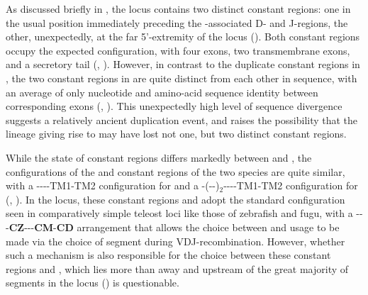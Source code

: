 As discussed briefly in , the \Xma \igh{} locus contains two distinct  constant regions: one in the usual position immediately preceding the -associated D- and J-regions, the other, unexpectedly, at the far 5'-extremity of the locus (). Both  constant regions occupy the expected configuration, with four \cz{} exons, two transmembrane exons, and a secretory tail (, ). However, in contrast to the duplicate constant regions in \Nfu, the two  constant regions in \Xma are quite distinct from each other in sequence, with an average of only  nucleotide and  amino-acid sequence identity between corresponding \cz{} exons (, ). This unexpectedly high level of sequence divergence suggests a relatively ancient duplication event, and raises the possibility that the lineage giving rise to \Nfu may have lost not one, but two distinct  constant regions.
	
\begin{table}
	\centering
	
	\label{tab:xma-cz-aln}
\end{table}

While the state of  constant regions differs markedly between \Xma and \Nfu, the configurations of the  and  constant regions of the two species are quite similar, with a {----TM1-TM2} configuration for  and a {-(--)$_2$----TM1-TM2} configuration for  (, ). In the \Xma locus, these constant regions and  adopt the standard configuration seen in comparatively simple teleost \igh{} loci like those of zebrafish and fugu, with a {\vh-\dh-\jh-\textbf{CZ}-\dh-\jh-\textbf{CM}-\textbf{CD}} arrangement that allows the choice between  and  usage to be made via the choice of \dh segment during VDJ-recombination. However, whether such a mechanism is also responsible for the choice between these constant regions and , which lies more than  away and upstream of the great majority of \vh segments in the locus () is questionable.

